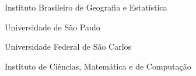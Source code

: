 \begin{siglas}
    \item[IBGE] Instituto Brasileiro de Geografia e Estatística
    \item[USP] Universidade de São Paulo
    \item [UFSCAR] Universidade Federal de São Carlos
    \item [ICMC] Instituto de Ciências, Matemática e de Computação
\end{siglas}